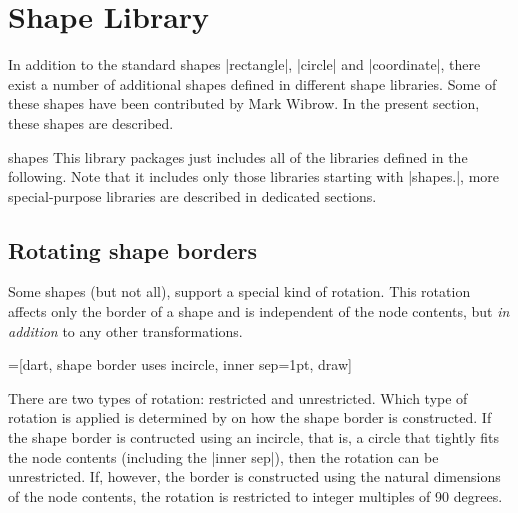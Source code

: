 %
%
%

\section{Shape Library}
\label{section-libs-shapes}

In addition to the standard shapes |rectangle|, |circle| and
|coordinate|, there exist a number of additional shapes defined in
different shape libraries. Some of these shapes have been contributed
by Mark Wibrow. In the present section, these shapes are
described.


\begin{pgflibrary}{shapes}
  This library packages just includes all of the libraries defined in
  the following. Note that it includes only those libraries starting
  with |shapes.|, more special-purpose libraries are described in
  dedicated sections.
\end{pgflibrary}

\subsection{Rotating shape borders} \label{section-rotating shape borders}

	Some shapes (but not all), support a special kind of rotation. This 
	rotation affects only the border of a shape and is independent of the 
	node contents, but \emph{in addition} to any other transformations.
	
\begin{codeexample}[]
=[dart, shape border uses incircle, 
  inner sep=1pt, draw]
\end{codeexample}

	There are two types of rotation: restricted and unrestricted. Which 
	type of rotation is applied is determined by on how the shape border 
	is	constructed. If the shape border is contructed using an incircle, 
	that is, a circle that tightly fits the node contents (including 
	the |inner sep|), then the rotation can be unrestricted. If, however,
	the border is constructed using the natural dimensions of the node
	contents, the rotation is restricted to integer multiples of 90 
	degrees.
	

